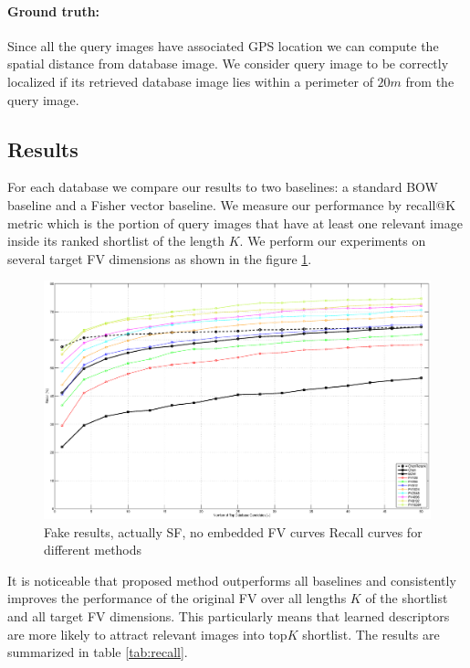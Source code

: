 \documentclass[table]{article} %
\begin{document}
		\vspace{-4mm}
		\paragraph{Ground truth:}
			Since all the query images have associated GPS location we can compute the spatial distance from database image. We consider query image to be correctly localized if its retrieved database image lies within a perimeter of $20m$ from the query image.
	
	\subsection{Results}
		For each database we compare our results to two baselines: a standard BOW baseline and a Fisher vector baseline. We measure our performance by recall@K metric which is the portion of query images that have at least one relevant image inside its ranked shortlist of the length $K$. We perform our experiments on several target FV dimensions as shown in the figure \ref{fig:recall}.

		\begin{figure}
		\centering
		\includegraphics[width=\linewidth]{evaluationWOWplot}	
		\caption{
			\textcolor{myRed}{Fake results, actually SF, no embedded FV curves}
			Recall curves for different methods
		}
		\label{fig:recall}
		\end{figure}

		It is noticeable that proposed method outperforms all baselines and consistently improves the performance of the original FV over all lengths $K$ of the shortlist and all target FV dimensions. This particularly means that learned descriptors are more likely to attract relevant images into top$K$ shortlist. The results are summarized in table \ref{tab:recall}.
\end{document}
